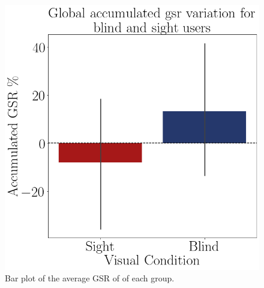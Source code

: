 \begin{figure}[!htb]
\begin{minipage}{.45\linewidth}
        \includegraphics[width = \linewidth]{Resultados/GSR/Figuras/png/barplot_gsr_sum.png}
        \caption{Bar plot of the average GSR of of each group.}
        \label{fig:barplot_gsr_avg}
    \end{minipage}
\end{figure}

